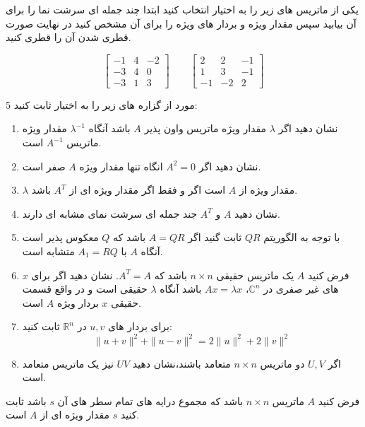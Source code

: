 \documentclass{article}
\begin{document}
	\clearpage
	 یکی از ماتریس های زیر  را به اختیار انتخاب کنید ابتدا چند جمله ای سرشت نما را برای آن بیابید سپس مقدار ویژه و بردار های ویژه را برای آن  مشخص کنید  در نهایت صورت قطری شدن آن را قطری کنید.
	
	$$\begin{bmatrix}
	-1&4&-2\\
	-3&4&0\\
	-3&1&3
	\end{bmatrix} \qquad
	\begin{bmatrix}
	2&2&-1\\
	1&3&-1\\
	-1&-2&2
	\end{bmatrix}
	$$
	
	5 مورد از گزاره های زیر را به اختیار ثابت کنید:
	\begin{enumerate}
		\item 
		نشان دهید اگر 
		$\lambda$
		مقدار ویژه ماتریس واون پذیر 
		$A$
		باشد آنگاه 
		$\lambda^{-1}$
		مقدار ویژه ماتریس 
		$A^{-1}$
		است.
		\item 
		نشان دهید اگر 
		$A^2=0$
		انگاه تنها  مقدار ویژه 
		$A$
		صفر است.
		\item 
		$\lambda$
		مقدار ویژه از 
		$A$
		است اگر و فقط اگر 
		مقدار ویژه ای از 
		$A^{T}$
		باشد.
		\item
		
		نشان دهید 
		$A$
		و 
		$A^{T}$
		جند جمله ای سرشت نمای مشابه ای دارند.
		\item 
		با توجه به الگوریتم 
		$QR$
		ثابت گنید اگر 
		$A=QR$
		باشد که 
		$Q$
		معکوس پذیر است آنگاه 
		$A$
		با 
		$A_1=RQ$
		متشابه است.
		\item 
		فرض کنید 
		$A$
		یک ماتریس حقیقی 
		$n\times n$
		باشد که 
		$A^T=A$.
		نشان دهید اگر برای 
		$x$
		های غیر صفری در 
		$\mathbb{C}^n$،
		$Ax=\lambda x$
		باشد آنگاه 
		$\lambda$
		حقیقی است و در واقع قسمت حقیقی 
		$x$
		بردار ویژه 
		$A$
		است.
		\item 
		برای بردار های 
		$u,v$
		در 
		$\mathbb{R}^n$
		ثابت کنید:
		$$\parallel u+v\parallel ^2 +\parallel u-v \parallel^2=2\parallel u\parallel^2+2\parallel v\parallel^2$$
		\item
		اگر 
		$U,V$
		دو ماتریس 
		$n\times n$
		متعامد باشند،نشان دهید 
		$UV$
		نیز یک ماتریس متعامد است.
	\end{enumerate}
	
	
	فرض کنید 
	$A$
	ماتریس 
	$n\times n$
	باشد که مجموع درایه های تمام سطر های آن
	$s$
	باشد ثابت کنید 
	$s$
	مقدار ویژه ای از 
	$A$
	است.
	
\end{document}
